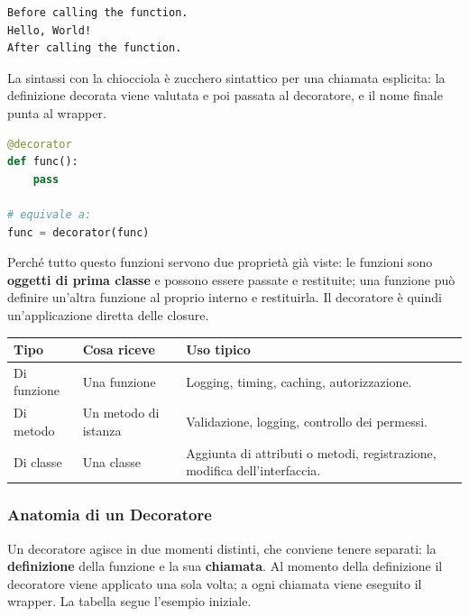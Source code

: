 \documentclass[12pt]{extarticle}
\begin{document}
\begin{lstlisting}[numbers=none]
Before calling the function.
Hello, World!
After calling the function.
\end{lstlisting}

\noindent La sintassi con la chiocciola è zucchero sintattico per una chiamata esplicita: la definizione decorata viene valutata e poi passata al decoratore, e il nome finale punta al wrapper.

\begin{lstlisting}[language=Python]
@decorator
def func():
    pass

# equivale a:
func = decorator(func)
\end{lstlisting}

\noindent Perché tutto questo funzioni servono due proprietà già viste: le funzioni sono \textbf{oggetti di prima classe} e possono essere passate e restituite; una funzione può definire un'altra funzione al proprio interno e restituirla. Il decoratore è quindi un'applicazione diretta delle closure.

\begin{center}
\small
\begin{tabular}{p{4.2cm}p{5.0cm}p{5.2cm}}
    \toprule
    \textbf{Tipo} & \textbf{Cosa riceve} & \textbf{Uso tipico} \\
    \midrule
    Di funzione & Una funzione & Logging, timing, caching, autorizzazione. \\
    \addlinespace
    Di metodo & Un metodo di istanza & Validazione, logging, controllo dei permessi. \\
    \addlinespace
    Di classe & Una classe & Aggiunta di attributi o metodi, registrazione, modifica dell'interfaccia. \\
    \bottomrule
\end{tabular}
\end{center}

\subsubsection{Anatomia di un Decoratore}

\noindent Un decoratore agisce in due momenti distinti, che conviene tenere separati: la \textbf{definizione} della funzione e la sua \textbf{chiamata}. Al momento della definizione il decoratore viene applicato una sola volta; a ogni chiamata viene eseguito il wrapper. La tabella segue l'esempio iniziale.
\end{document}
